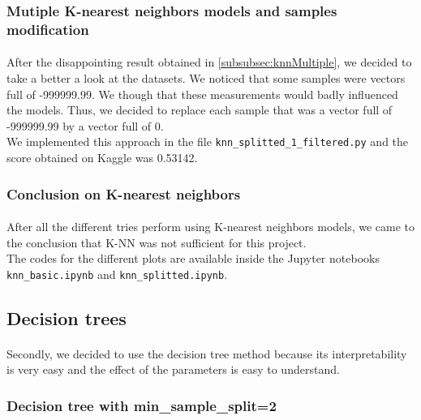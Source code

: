 \documentclass[a4paper, 11pt, oneside]{article}
\begin{document}
\subsubsection{Mutiple K-nearest neighbors models and samples modification} \label{subsubsec:knnMultipleModif}
\paragraph{}After the disappointing result obtained in \ref{subsubsec:knnMultiple}, we decided to take a better a look at the datasets. We noticed that some samples were vectors full of -999999.99. We though that these measurements would badly influenced the models. Thus, we decided to replace each sample that was a vector full of -999999.99 by a vector full of 0.\\
We implemented this approach in the file \texttt{knn\_splitted\_1\_filtered.py} and the score obtained on Kaggle was 0.53142.

\subsubsection{Conclusion on K-nearest neighbors}
\paragraph{}After all the different tries perform using K-nearest neighbors models, we came to the conclusion that K-NN was not sufficient for this project.\\
The codes for the different plots are available inside the Jupyter notebooks \texttt{knn\_basic.ipynb} and \texttt{knn\_splitted.ipynb}.


\subsection{Decision trees}\label{subsec:dt}
\paragraph{}Secondly, we decided to use the decision tree method because its interpretability is very easy and the effect of the parameters is easy to understand.

\subsubsection{Decision tree with min\_sample\_split=2} \label{subsubsec:dt2}
\end{document}
